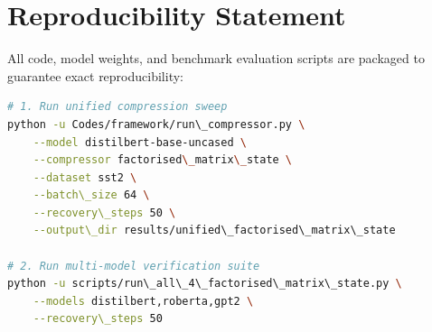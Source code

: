 \section{Reproducibility Statement}
All code, model weights, and benchmark evaluation scripts are packaged to guarantee exact reproducibility:
\begin{lstlisting}[language=bash]
# 1. Run unified compression sweep
python -u Codes/framework/run\_compressor.py \
    --model distilbert-base-uncased \
    --compressor factorised\_matrix\_state \
    --dataset sst2 \
    --batch\_size 64 \
    --recovery\_steps 50 \
    --output\_dir results/unified\_factorised\_matrix\_state

# 2. Run multi-model verification suite
python -u scripts/run\_all\_4\_factorised\_matrix\_state.py \
    --models distilbert,roberta,gpt2 \
    --recovery\_steps 50
\end{lstlisting}
